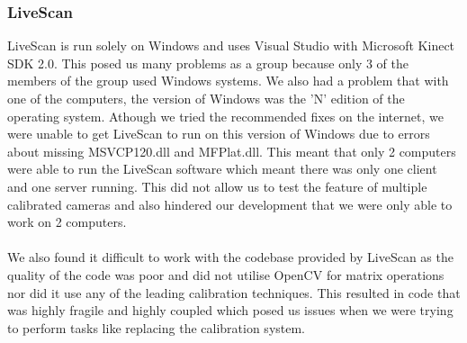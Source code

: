 \documentclass{article}
\begin{document}
\subsubsection{LiveScan}
LiveScan is run solely on Windows and uses Visual Studio with Microsoft Kinect SDK 2.0. This posed us many problems as a group because only 3 of the members of the group used Windows systems. We also had a problem that with one of the computers, the version of Windows was the 'N' edition of the operating system. Athough we tried the recommended fixes on the internet, we were unable to get LiveScan to run on this version of Windows due to errors about missing MSVCP120.dll and MFPlat.dll. This meant that only 2 computers were able to run the LiveScan software which meant there was only one client and one server running. This did not allow us to test the feature of multiple calibrated cameras and also hindered our development that we were only able to work on 2  computers.
\\\\
We also found it difficult to work with the codebase provided by LiveScan as the quality of the code was poor and did not utilise OpenCV for matrix operations nor did it use any of the leading calibration techniques. This resulted in code that was highly fragile and highly coupled which posed us issues when we were trying to perform tasks like replacing the calibration system.
\end{document}
